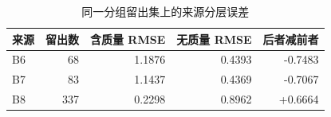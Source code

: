 \begin{table}[!htbp]
\centering
\songti{}
\setlength{\tabcolsep}{4pt}
\caption{同一分组留出集上的来源分层误差}
\label{tab:q2-source-validation}
\begin{tabular}{lrrrr}
\toprule
来源 & 留出数 & 含质量 RMSE & 无质量 RMSE & 后者减前者 \\
\midrule
B6 & 68 & 1.1876 & 0.4393 & -0.7483 \\
B7 & 83 & 1.1437 & 0.4369 & -0.7067 \\
B8 & 337 & 0.2298 & 0.8962 & +0.6664 \\
\bottomrule
\end{tabular}
\end{table}
